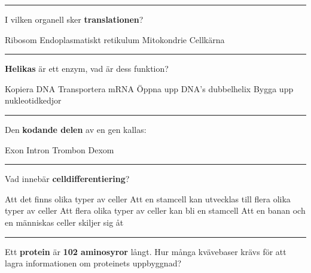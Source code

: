 \documentclass{exam}
\begin{document}
\begin{questions}
\vspace{5mm} %
\hrule 
\vspace{5mm} %
\question  I vilken organell sker \textbf{translationen}?
\begin{checkboxes}
   \correctchoice Ribosom
   \choice Endoplasmatiskt retikulum
   \choice Mitokondrie
   \choice Cellkärna 
\end{checkboxes}

\vspace{5mm} %
\hrule
\vspace{5mm} %

\question  \textbf{Helikas} är ett enzym, vad är dess funktion?
\begin{checkboxes}
   \choice Kopiera DNA
   \choice Transportera mRNA
   \correctchoice Öppna upp DNA's dubbelhelix
   \choice Bygga upp nukleotidkedjor 
\end{checkboxes}

\vspace{5mm} %
\hrule 
\vspace{5mm} %

\question  Den \textbf{kodande delen} av en gen kallas:
\begin{checkboxes}
   \correctchoice Exon
   \choice Intron
   \choice Trombon
   \choice Dexom 
\end{checkboxes}

\vspace{5mm} %
\hrule 
\vspace{5mm} %

\question  Vad innebär \textbf{celldifferentiering}?
\begin{checkboxes}
   \choice Att det finns olika typer av celler
   \correctchoice Att en stamcell kan utvecklas till flera olika typer av celler
   \choice Att flera olika typer av celler kan bli en stamcell
   \choice Att en banan och en människas celler skiljer sig åt 
\end{checkboxes}

\vspace{5mm} %
\hrule 
\vspace{5mm} %
\question  Ett \textbf{protein} är \textbf{102 aminosyror} långt. Hur många kvävebaser krävs för att lagra informationen om proteinets uppbyggnad?
\begin{checkboxes}
\end{checkboxes}


\end{questions}
\end{document}

